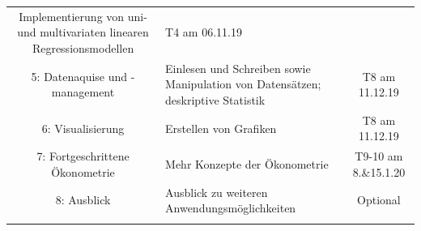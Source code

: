\documentclass[]{book}
\begin{document}
\begin{longtable}[]{@{}clc@{}}
\begin{minipage}[t]{0.24\columnwidth}
Implementierung von uni- und multivariaten linearen
Regressionsmodellen\strut
\end{minipage} & \begin{minipage}[t]{0.38\columnwidth}\centering\strut
T4 am 06.11.19\strut
\end{minipage}\tabularnewline
\begin{minipage}[t]{0.10\columnwidth}\centering\strut
5: Datenaquise und -management\strut
\end{minipage} & \begin{minipage}[t]{0.24\columnwidth}\raggedright\strut
Einlesen und Schreiben sowie Manipulation von Datensätzen; deskriptive
Statistik\strut
\end{minipage} & \begin{minipage}[t]{0.38\columnwidth}\centering\strut
T8 am 11.12.19\strut
\end{minipage}\tabularnewline
\begin{minipage}[t]{0.10\columnwidth}\centering\strut
6: Visualisierung\strut
\end{minipage} & \begin{minipage}[t]{0.24\columnwidth}\raggedright\strut
Erstellen von Grafiken\strut
\end{minipage} & \begin{minipage}[t]{0.38\columnwidth}\centering\strut
T8 am 11.12.19\strut
\end{minipage}\tabularnewline
\begin{minipage}[t]{0.10\columnwidth}\centering\strut
7: Fortgeschrittene Ökonometrie\strut
\end{minipage} & \begin{minipage}[t]{0.24\columnwidth}\raggedright\strut
Mehr Konzepte der Ökonometrie\strut
\end{minipage} & \begin{minipage}[t]{0.38\columnwidth}\centering\strut
T9-10 am 8.\&15.1.20\strut
\end{minipage}\tabularnewline
\begin{minipage}[t]{0.10\columnwidth}\centering\strut
8: Ausblick\strut
\end{minipage} & \begin{minipage}[t]{0.24\columnwidth}\raggedright\strut
Ausblick zu weiteren Anwendungsmöglichkeiten\strut
\end{minipage} & \begin{minipage}[t]{0.38\columnwidth}\centering\strut
Optional\strut
\end{minipage}\tabularnewline
\begin{minipage}[t]{0.10\columnwidth}\centering\strut

\end{minipage}
\end{longtable}
\end{document}
